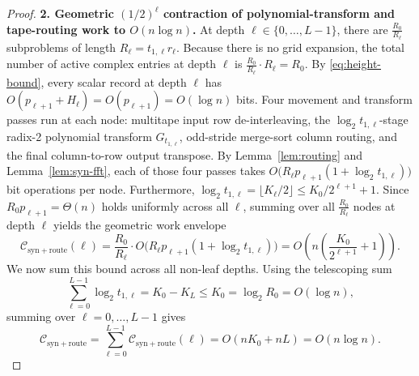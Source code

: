 \begin{proof}
\textbf{2. Geometric $(1/2)^\ell$ contraction of polynomial-transform and tape-routing work to $O(n \log n)$.}
At depth $\ell \in \{0, \dots, L-1\}$, there are $\frac{R_0}{R_\ell}$ subproblems of length $R_\ell = t_{1,\ell} r_\ell$. Because there is no grid expansion, the total number of active complex entries at depth $\ell$ is $\frac{R_0}{R_\ell} \cdot R_\ell = R_0$. By \eqref{eq:height-bound}, every scalar record at depth $\ell$ has $O(p_{\ell+1} + H_\ell) = O(p_{\ell+1}) = O(\log n)$ bits. Four movement and transform passes run at each node: multitape input row de-interleaving, the $\log_2 t_{1,\ell}$-stage radix-2 polynomial transform $G_{t_{1,\ell}}$, odd-stride merge-sort column routing, and the final column-to-row output transpose. By Lemma~\ref{lem:routing} and Lemma~\ref{lem:syn-fft}, each of those four passes takes $O\bigl(R_\ell p_{\ell+1} (1 + \log_2 t_{1,\ell})\bigr)$ bit operations per node. Furthermore, $\log_2 t_{1,\ell} = \lfloor K_\ell / 2 \rfloor \le K_0 / 2^{\ell+1} + 1$. Since $R_0 p_{\ell+1} = \Theta(n)$ holds uniformly across all $\ell$, summing over all $\frac{R_0}{R_\ell}$ nodes at depth $\ell$ yields the geometric work envelope
\[
  \mathcal{C}_{\mathrm{syn+route}}(\ell) = \frac{R_0}{R_\ell} \cdot O\bigl(R_\ell p_{\ell+1}(1 + \log_2 t_{1,\ell})\bigr) = O\!\left(n \left(\frac{K_0}{2^{\ell+1}} + 1\right)\right).
\]
We now sum this bound across all non-leaf depths. Using the telescoping sum
\[
  \sum_{\ell=0}^{L-1} \log_2 t_{1,\ell} = K_0 - K_L \le K_0 = \log_2 R_0 = O(\log n),
\]
summing over $\ell = 0, \dots, L-1$ gives
\begin{equation}\label{eq:syn-route-total}
  \mathcal{C}_{\mathrm{syn+route}} = \sum_{\ell=0}^{L-1} \mathcal{C}_{\mathrm{syn+route}}(\ell) = O(n K_0 + n L) = O(n \log n).
\end{equation}


\end{proof}
